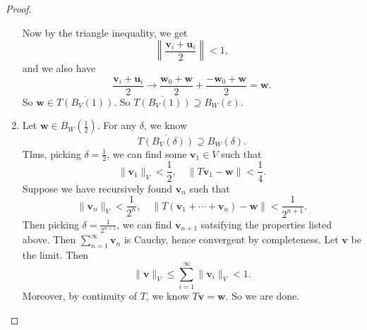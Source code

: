 \documentclass[a4paper]{article}
\begin{document}
\begin{proof}
\begin{enumerate}
      Now by the triangle inequality, we get
      \[
        \left\|\frac{\mathbf{v}_i + \mathbf{u}_i}{2}\right\| < 1,
      \]
      and we also have
      \[
        \frac{\mathbf{v}_i + \mathbf{u}_i}{2} \to \frac{\mathbf{w}_0 + \mathbf{w}}{2} + \frac{-\mathbf{w}_0 + \mathbf{w}}{2} = \mathbf{w}.
      \]
      So $\mathbf{w}\in \overline{T(B_V(1))}$. So $\overline{T(B_V(1))} \supseteq B_W(\varepsilon)$.
    \item Let $\mathbf{w} \in B_W(\frac{1}{2})$. For any $\delta$, we know
      \[
        \overline{T(B_V(\delta))} \supseteq B_W(\delta).
      \]
      Thus, picking $\delta = \frac{1}{2}$, we can find some $\mathbf{v}_1 \in V$ such that
      \[
        \|\mathbf{v}_1\|_V < \frac{1}{2},\quad \|T \mathbf{v}_1 - \mathbf{w}\| < \frac{1}{4}.
      \]
      Suppose we have recursively found $\mathbf{v}_n$ such that
      \[
        \|\mathbf{v}_n\|_V < \frac{1}{2^n},\quad \|T (\mathbf{v}_1 + \cdots + \mathbf{v}_n) - \mathbf{w}\| < \frac{1}{2^{n + 1}}.
      \]
      Then picking $\delta = \frac{1}{2^{n + 1}}$, we can find $\mathbf{v}_{n + 1}$ satsifying the properties listed above. Then $\sum_{n = 1}^\infty \mathbf{v}_n$ is Cauchy, hence convergent by completeness. Let $\mathbf{v}$ be the limit. Then
      \[
        \|\mathbf{v}\|_V \leq \sum_{i = 1}^\infty \|\mathbf{v}_i\|_V < 1.
      \]
      Moreover, by continuity of $T$, we know $T\mathbf{v} = \mathbf{w}$. So we are done.
%
%
%

\end{enumerate}
\end{proof}
\end{document}
